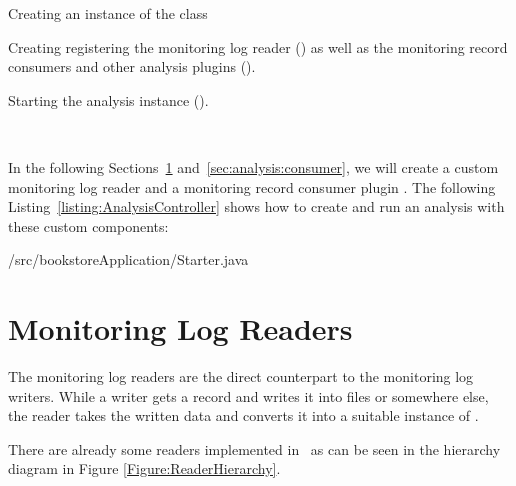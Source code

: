 \begin{compactenum}
\item Creating an instance of the  class
\item Creating registering the monitoring log reader () as %
well as the monitoring record consumers and other analysis plugins ().
\item Starting the analysis instance ().
\end{compactenum}

\

\noindent In the following Sections~\ref{sec:analysis:reader} and~\ref{sec:analysis:consumer}, %
we will create a custom monitoring log reader  and a %
monitoring record consumer plugin . %
\noindent The following Listing~\ref{listing:AnalysisController} shows how to create and run an analysis %
with these custom components:

\setJavaCodeListing
	{\customComponentsBookstoreApplicationDir/src/bookstoreApplication/Starter.java}

\section{Monitoring Log Readers}\label{sec:analysis:reader}

The monitoring log readers are the direct counterpart to the monitoring log writers. While a writer gets a record and writes it into files or somewhere else, the reader takes the written data and converts it into a suitable instance of .

% 
% 

\noindent There are already some readers implemented in \Kieker\  as can be seen in the hierarchy diagram in Figure \ref{Figure:ReaderHierarchy}.

